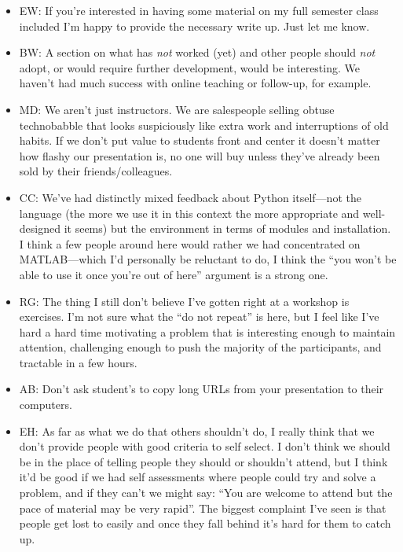 \documentclass{article}
\begin{document}
\begin{itemize}

  \item EW: If you're interested in having some material on my full
    semester class included I'm happy to provide the necessary write
    up. Just let me know.

  \item BW: A section on what has {\em not} worked (yet) and other people
    should {\em not} adopt, or would require further development, would
    be interesting. We haven't had much success with online teaching or
    follow-up, for example.

  \item MD: We aren't just instructors. We are salespeople selling
    obtuse technobabble that looks suspiciously like extra work and
    interruptions of old habits. If we don't put value to students
    front and center it doesn't matter how flashy our presentation is,
    no one will buy unless they've already been sold by their
    friends/colleagues.

  \item CC: We've had distinctly mixed feedback about Python
    itself---not the language (the more we use it in this context the
    more appropriate and well-designed it seems) but the environment
    in terms of modules and installation. I think a few people around
    here would rather we had concentrated on MATLAB---which I'd
    personally be reluctant to do, I think the ``you won't be able to
    use it once you're out of here'' argument is a strong one.

  \item RG: The thing I still don't believe I've gotten right at a
    workshop is exercises. I'm not sure what the ``do not repeat'' is
    here, but I feel like I've hard a hard time motivating a problem
    that is interesting enough to maintain attention, challenging
    enough to push the majority of the participants, and tractable in
    a few hours.

  \item AB: Don't ask student's to copy long URLs from your
    presentation to their computers.

  \item EH: As far as what we do that others shouldn't do, I really
    think that we don't provide people with good criteria to self
    select.  I don't think we should be in the place of telling people
    they should or shouldn't attend, but I think it'd be good if we
    had self assessments where people could try and solve a problem,
    and if they can't we might say: ``You are welcome to attend but
    the pace of material may be very rapid''.  The biggest complaint
    I've seen is that people get lost to easily and once they fall
    behind it's hard for them to catch up.


\end{itemize}
\end{document}

